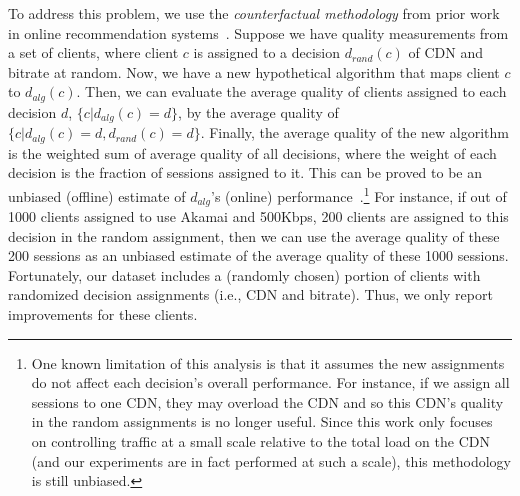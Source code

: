 To address this problem, we use the 
{\em counterfactual methodology} from prior work in 
online recommendation 
systems~\cite{li2010contextual,li2011unbiased}.
Suppose we have quality measurements from a 
set of clients,
where client $c$ is assigned to a decision $d_{rand}(c)$ 
of CDN and bitrate at random.
Now, we have a new hypothetical algorithm that maps 
client $c$ to $d_{alg}(c)$. 
Then, we can evaluate the average quality of clients 
assigned to each decision $d$,  $\{c|d_{alg}(c)=d\}$, 
by the average quality of $\{c|d_{alg}(c)=d,d_{rand}(c)=d\}$.
Finally, the average quality of the new algorithm is 
the weighted sum of average quality of all decisions, 
where the weight of each decision is the fraction of 
sessions assigned to it.
This can be proved to be an unbiased (offline) 
estimate of $d_{alg}$'s (online) 
performance~\cite{austin2011introduction}.\footnote{One known 
limitation of this analysis is that it assumes the new 
assignments do not affect each decision's overall 
performance. 
For instance, if we assign all sessions to one CDN, 
they may overload the CDN and so this CDN's quality 
in the random assignments is no longer useful. 
Since this work only focuses on controlling traffic at a 
small scale relative to the total load on the CDN (and 
our experiments are in fact performed at such a scale), 
this methodology is still unbiased.}
For instance, if out of 1000 clients assigned to use 
Akamai and 500Kbps, 200 clients are assigned to this 
decision in the random assignment, then we can use 
the average quality of these 200 sessions as an unbiased
estimate of the average quality of these 1000 sessions.
Fortunately, our dataset includes a (randomly chosen) 
portion of clients with randomized decision assignments 
(i.e., CDN and bitrate). 
Thus, we  only report improvements  for these clients. 



